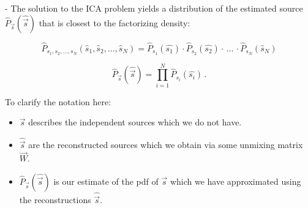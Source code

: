 \begin{frame}


\pause

- The solution to the ICA problem yields a distribution of the estimated source $\widehat{P}_{\vec s}(\widehat{\vec s})$ that is closest to the factorizing density:

\begin{equation}
\widehat{P}_{s_1, s_2,\ldots,s_N}({\widehat s_1, \widehat s_2,\ldots,\widehat s_N}) = \widehat{P}_{s_1}(\widehat{s_1}) \cdot \widehat{P}_{s_2}(\widehat{s_2}) \cdot \, \ldots \, \cdot \widehat{P}_{s_N}(\widehat{s}_N)
\end{equation}

\pause

\begin{equation}
\label{eq:facts}
\widehat{P}_{\vec s}(\widehat{\vec s}) = \prod_{i=1}^{N} \widehat{P}_{s_i}(\widehat{s_i})  \,.
\end{equation}

To clarify the notation here:\\
\begin{itemize}
\setlength\itemsep{0.1em}
\item $\vec s$ describes the independent sources which we do not have.
\item $\widehat{\vec s}$ are the reconstructed sources which we obtain via some unmixing matrix $\vec W$.
\item $\widehat{P}_{\vec s}(\widehat{\vec s})$ is our estimate of the pdf of $\vec s$ which we have approximated using the reconstructions $\widehat{\vec s}$. 
\end{itemize}

\end{frame}
